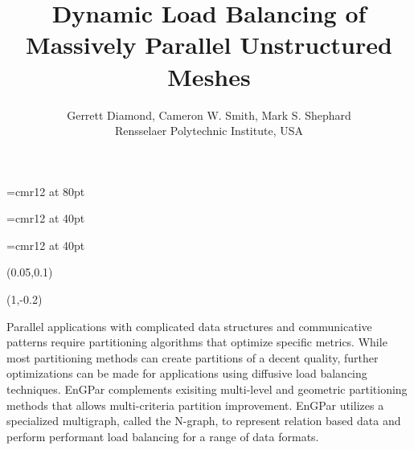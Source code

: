 \documentclass{beamer}
\begin{document}
\font\titlefont=cmr12 at 80pt
\title[Load Balancing of Unstructured Meshes]
{\titlefont
  Dynamic Load Balancing of \\[0.3cm]Massively Parallel Unstructured Meshes
}
\font\authorfont=cmr12 at 40pt
\author[G. Diamond]{\authorfont
  Gerrett Diamond, Cameron W. Smith, Mark S. Shephard\\
  Rensselaer Polytechnic Institute, USA}
\date{}
\font\abstractfont=cmr12 at 40pt
\begin{textblock}{15.8}(0.05,0.1)
  \titlepage
  \begin{textblock}{14}(1,-0.2)
    \begin{block}{}
      \begin{center}
      \abstractfont
      Parallel applications with complicated data structures and communicative patterns require partitioning algorithms that optimize specific metrics. While most partitioning methods can create partitions of a decent quality, further optimizations can be made for applications using diffusive load balancing techniques. EnGPar complements exisiting multi-level and geometric partitioning methods that allows multi-criteria partition improvement. EnGPar utilizes a specialized multigraph, called the N-graph, to represent relation based data and perform performant load balancing for a range of data formats.
              
      \end{center}
    \end{block}
  \end{textblock}
\end{textblock}
\end{document}
